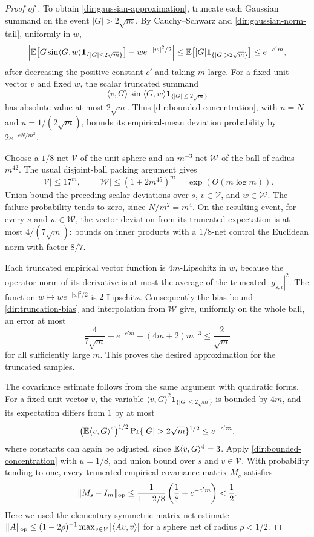 \begin{proof}[Proof of ]
To obtain \eqref{dir:gaussian-approximation}, truncate each Gaussian summand
on the event $|G|>2\sqrt m$.  By Cauchy--Schwarz and
\eqref{dir:gaussian-norm-tail}, uniformly in $w$,
\begin{equation}\label{dir:truncation-bias}
 \left|\E\bigl[G\sin\langle G,w\rangle
                   \mathbf 1_{\{|G|\le2\sqrt m\}}\bigr]
               -w e^{-|w|^2/2}\right|
 \le \E\bigl[|G|\mathbf 1_{\{|G|>2\sqrt m\}}\bigr]
 \le e^{-c' m},
\end{equation}
after decreasing the positive constant $c'$ and taking $m$ large.
For a fixed unit vector $v$ and fixed $w$, the scalar truncated summand
\[
 \langle v,G\rangle\sin\langle G,w\rangle
       \mathbf 1_{\{|G|\le2\sqrt m\}}
\]
has absolute value at most $2\sqrt m$.  Thus
\eqref{dir:bounded-concentration}, with $n=N$ and
$u=1/(2\sqrt m)$, bounds its empirical-mean deviation probability by
$2e^{-cN/m^2}$.

Choose a $1/8$-net $\mathcal V$ of the unit sphere and an $m^{-3}$-net
$\mathcal W$ of the ball of radius $m^{42}$.  The usual disjoint-ball packing
argument gives
\[
 |\mathcal V|\le17^m,
 \qquad
 |\mathcal W|\le(1+2m^{45})^m
                 =\exp(O(m\log m)).
\]
Union bound the preceding scalar deviations over $s$, $v\in\mathcal V$,
and $w\in\mathcal W$.  The failure probability tends to zero, since
$N/m^2=m^4$.  On the resulting event, for every $s$ and $w\in\mathcal W$,
the vector deviation from its truncated expectation is at most
$4/(7\sqrt m)$: bounds on inner products with a $1/8$-net control the
Euclidean norm with factor $8/7$.

Each truncated empirical vector function is $4m$-Lipschitz in $w$, because
the operator norm of its derivative is at most the average of the
truncated $|g_{s,i}|^2$.  The function $w\mapsto we^{-|w|^2/2}$ is
$2$-Lipschitz.  Consequently the bias bound
\eqref{dir:truncation-bias} and interpolation from $\mathcal W$ give,
uniformly on the whole ball, an error at most
\[
 \frac{4}{7\sqrt m}+e^{-c'm}+(4m+2)m^{-3}
 \le \frac2{\sqrt m}
\]
for all sufficiently large $m$.  This proves the desired approximation
for the truncated samples.

The covariance estimate follows from the same argument with quadratic
forms.  For a fixed unit vector $v$, the variable
$\langle v,G\rangle^2\mathbf 1_{\{|G|\le2\sqrt m\}}$ is bounded by $4m$,
and its expectation differs from $1$ by at most
\[
 \bigl(\E\langle v,G\rangle^4\bigr)^{1/2}
 \Pr\{|G|>2\sqrt m\}^{1/2}
 \le e^{-c'm},
\]
where constants can again be adjusted, since
$\mathbb E\langle v,G\rangle^4=3$.  Apply
\eqref{dir:bounded-concentration} with $u=1/8$, and union bound over $s$
and $v\in\mathcal V$.  With probability tending to one, every truncated
empirical covariance matrix $M_s$ satisfies
\[
 \|M_s-I_m\|_{\mathrm{op}}
 \le\frac{1}{1-2/8}\left(\frac18+e^{-c'm}\right)
 <\frac12.
\]
Here we used the elementary symmetric-matrix net estimate
$\|A\|_{\mathrm{op}}\le(1-2\rho)^{-1}\max_{v\in\mathcal V}|\langle Av,v\rangle|$
for a sphere net of radius $\rho<1/2$.


\end{proof}
